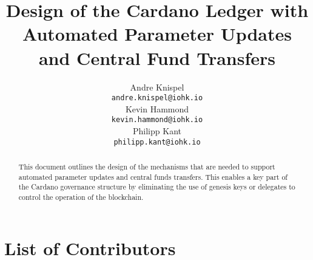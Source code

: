 

\cleardoublepage
\renewcommand{\thepage}{\arabic{page}}
\setcounter{page}{1}

\title{Design of the Cardano Ledger with Automated Parameter Updates and Central Fund Transfers}

\author{
   Andre Knispel \\ {\small \texttt{andre.knispel@iohk.io}} \\
   Kevin Hammond \\ {\small \texttt{kevin.hammond@iohk.io}} \\
   Philipp Kant \\ {\small \texttt{philipp.kant@iohk.io}} \\
   }

\date{}

\maketitle

\begin{abstract}
  This document outlines the design of the mechanisms that are needed to support
  automated parameter updates and central funds transfers.  This enables a key part of the Cardano governance structure by
  eliminating the use of genesis keys or delegates to control the operation of the blockchain.
\end{abstract}

\section*{List of Contributors}
\label{acknowledgements}

